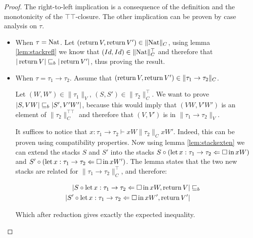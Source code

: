 \begin{ensps}
\begin{proof}
    The right-to-left implication is a consequence of the definition 
    and the monotonicity of the $\top\top$-closure.
    The other implication can be proven by case analysis on $\tau$.

    \begin{itemize}
        \item When $\tau = \textnormal{Nat}$. Let $(\operatorname{return} V, \operatorname{return} V') \in \| \textnormal{Nat} \|_C$,
            using lemma \ref{lem:stackrefl} we know that $(Id,Id) \in \| \textnormal{Nat}
            \|_C^\top$ and therefore that $|\operatorname{return} V| \sqsubseteq_b |\operatorname{return} V'|$, thus 
            proving the result.
        
        \item When $\tau = \tau_1 \to \tau_2$.
            Assume that $(\operatorname{return} V, \operatorname{return} V') \in 
            \| \tau_1 \to \tau_2 \|_C$.

            Let $(W,W') \in \| \tau_1 \|_V$, $(S,S') \in \| \tau_2 \|_C^\top$.
            We want to prove $|S, VW| \sqsubseteq_b |S',V'W'|$, because this would
            imply that $(VW,V'W')$ is an element of $\| \tau_2 \|_C^{\top\top}$
            and therefore that 
            $(V,V')$ is in $\| \tau_1 \to \tau_2 \|_V$.

            It suffices to notice that $x: \tau_1 \to \tau_2 \vdash xW \| \tau_2
            \|_C x W'$. Indeed, this can be proven using compatibility
            properties. Now using lemma \ref{lem:stackexten} we can extend the
            stacks $S$ and $S'$ into the stacks $S \circ
            (\operatorname{let} x:\tau_1 \to \tau_2 \Leftarrow \square \operatorname{in} xW)$ and $S' \circ
            (\operatorname{let} x:\tau_1 \to \tau_2 \Leftarrow \square \operatorname{in} xW')$. The lemma 
            states that the two new stacks are related for $\| \tau_1 \to \tau_2
            \|_C^\top$, and therefore:

            \begin{align*}
                |S \circ \operatorname{let} x:\tau_1 \to \tau_2 \Leftarrow \square \operatorname{in} xW, \operatorname{return} V| &\sqsubseteq_b \\
                |S' \circ \operatorname{let} x:\tau_1 \to \tau_2 \Leftarrow \square \operatorname{in} xW', \operatorname{return} V'| 
            \end{align*}

            Which after reduction gives exactly the expected inequality.

    \end{itemize}
\end{proof}
\end{ensps}


